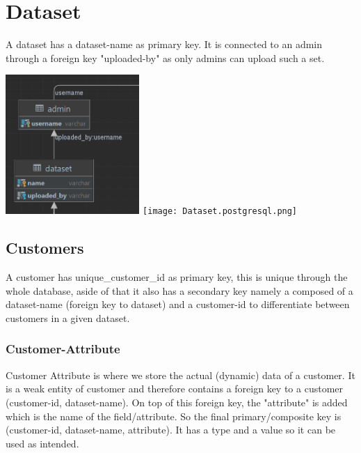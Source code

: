 \documentclass[a4paper,12pt]{article}
\begin{document}
	\section{Dataset}
	A dataset has a dataset-name as primary key. It is connected to an admin through a foreign key "uploaded-by" as only admins can upload such a set.
	\begin{center}
		  		\includegraphics[height={200px},width=\textwidth,keepaspectratio]{Dataset.png}
		  		\texttt{[image: Dataset.postgresql.png]}
	\end{center}
	\pagebreak
	\subsection{Customers}
	A customer has unique\_customer\_id as primary key, this is unique through the whole database, aside of that it also has a secondary key namely a composed of a dataset-name (foreign key to dataset) and a customer-id to differentiate between customers in a given dataset.
	\subsubsection{Customer-Attribute}	
	Customer Attribute is where we store the actual (dynamic) data of a customer. It is a weak entity of customer and therefore contains a foreign key to a customer (customer-id, dataset-name). On top of this foreign key, the "attribute" is added which is the name of the field/attribute. So the final primary/composite key is (customer-id, dataset-name, attribute). It has a type and a value so it can be used as intended.
	
\end{document}
